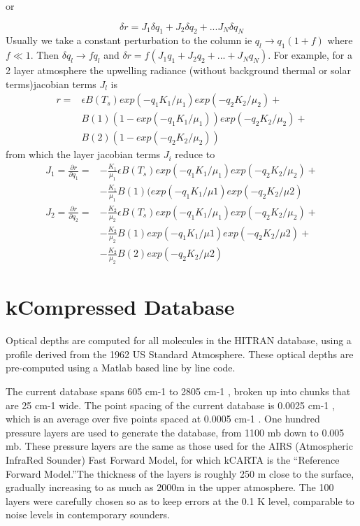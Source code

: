 \documentclass[11pt]{article}
\newcommand{\kc}{kCARTA }
\newcommand{\wn}{cm-1 }
\begin{document}
or 

\[
\delta r = J_{1} \delta q_1 + J_{2} \delta q_2 + ...
               J_{N} \delta q_N
\]
Usually we take a constant perturbation to the column ie $q_{l} \rightarrow 
q_{1}(1 + f)$ where $f \ll 1$. Then $\delta q_{l} \rightarrow f q_{l}$ and
$\delta r = f(J_{1} q_1 + J_{2} q_2 + ... + J_{N} q_N )$. For example, 
for a 2 layer atmosphere the upwelling radiance (without background thermal 
or solar terms)jacobian terms $J_{l}$ is 
\begin{eqnarray*}
r = & \epsilon B(T_{s}) exp(-q_{1} K_{1}/\mu_{1})exp(-q_{2} K_{2}/\mu_{2}) +\\
    & B(1)(1-exp(-q_{1} K_{1}/\mu_{1}))exp(-q_{2} K_{2}/\mu_{2}) + \\
    & B(2)(1-exp(-q_{2} K_{2}/\mu_{2}))
\end{eqnarray*}
from which the layer jacobian terms $J_{i}$ reduce to
\begin{eqnarray*}
J_{1} = \frac{\partial r}{\partial q_1} = & 
 -\frac{K_1}{\mu_1}\epsilon B(T_{s})exp(-q_1 K_1/\mu_1)exp(-q_2 K_2/\mu_2) + \\
&-\frac{K_1}{\mu_1} B(1)(exp(-q_{1} K_{1}/\mu{1})exp(-q_{2} K_{2}/\mu{2})
\end{eqnarray*}
\begin{eqnarray*}
J_{2} = \frac{\partial r}{\partial q_2} = & 
-\frac{K_2}{\mu_2}\epsilon B(T_{s})exp(-q_1 K_1/\mu_1)exp(-q_2 K_2/\mu_2) + \\
& -\frac{K_2}{\mu_2} B(1)exp(-q_{1} K_{1}/\mu{1})exp(-q_{2} K_{2}/\mu{2}) + \\
& -\frac{K_2}{\mu_2} B(2)exp(-q_{2} K_{2}/\mu{2})
\end{eqnarray*}

\section{kCompressed Database}

Optical depths are computed for all molecules in the HITRAN database, using
a profile derived from the 1962 US Standard Atmosphere. These optical
depths are pre-computed using a Matlab based line by line code.

The current database spans 605 \wn to 2805 \wn, broken up into chunks
that are 25 \wn wide. The point spacing of the current database is 0.0025 \wn,
which is an average over five points spaced at 0.0005 \wn.
One hundred pressure layers are used to generate the 
database, from 1100 mb down to 0.005 mb.  These pressure layers are the same 
as those used for the AIRS (Atmospheric InfraRed Sounder) Fast Forward Model, 
for which \kc is the ``Reference Forward Model.''The thickness of the layers 
is roughly 250 m close to the surface, gradually increasing to as much as 
2000m in the upper atmosphere. The 100 layers were carefully chosen so as to 
keep errors at the 0.1 K level, comparable to noise levels in contemporary 
sounders.
\end{document}
